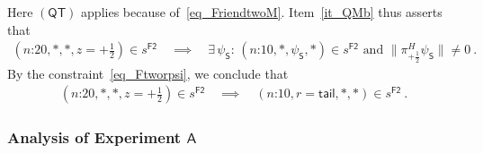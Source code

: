 \documentclass[12pt]{article}
\theoremstyle{plain}
\theoremstyle{definition}
\newcommand*{\Friendtwo}{\mathsf{F2}}
\newcommand*{\Assistant}{\mathsf{A}}
\newcommand*{\Spin}{\mathsf{S}}
\newcommand*{\splus}{{\textstyle + \frac{1}{2}}}
\newcommand*{\QT}{\mathsf{(QT)}}
\newcommand*{\tail}{\mathsf{tail}}
\begin{document}
Here $\QT$ applies because of~\eqref{eq_FriendtwoM}. Item~\ref{it_QMb} thus asserts that
\begin{align*}
   (\text{$n$:20}, *, *, z=\splus) \in s^{\Friendtwo}  \quad \implies \quad \exists \, \psi_{\Spin} : \,  (\text{$n$:10}, *, \psi_{\Spin}, *) \in s^{\Friendtwo} \text{ and } \|\pi^H_{+\frac{1}{2}} \psi_{\Spin}\| \neq 0  \ .
\end{align*}
By the constraint~\eqref{eq_Ftworpsi}, we conclude that
\begin{align} \label{eq_QTFriendtwo}
  (\text{$n$:20}, *, *, z = \splus) \in s^{\Friendtwo} \quad \implies \quad 
(\text{$n$:10}, r = \tail, *, *) \in s^{\Friendtwo} \ .
\end{align}

\subsubsection*{Analysis of Experiment $\Assistant$}  
\end{document}
